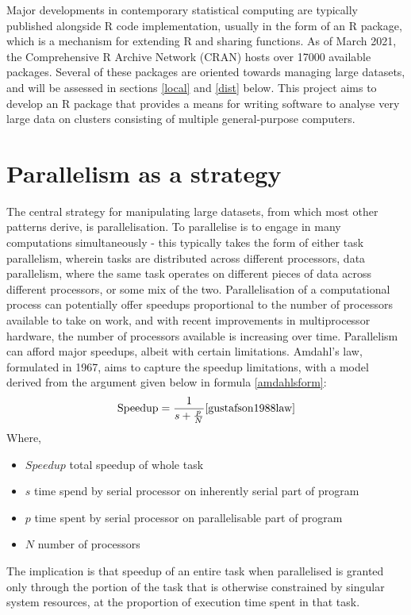 \documentclass[a4paper,10pt]{article}
\begin{document}
Major developments in contemporary statistical computing are typically published alongside R code implementation, usually in the form of an R package, which is a mechanism for extending R and sharing functions.
As of March 2021, the Comprehensive R Archive Network (CRAN) hosts over 17000 available packages\cite{team20:_r}.
Several of these packages are oriented towards managing large datasets, and will be assessed in sections \ref{local} and \ref{dist}  below.
This project aims to develop an R package that provides a means for writing software to analyse very large data on clusters consisting of multiple general-purpose computers.

\section{Parallelism as a strategy}
\label{parallel}
The central strategy for manipulating large datasets, from which most other patterns derive, is parallelisation. To parallelise is to engage in many computations simultaneously - this typically takes the form of either task parallelism, wherein tasks are distributed across different processors, data parallelism, where the same task operates on different pieces of data across different processors, or some mix of the two.
Parallelisation of a computational process can potentially offer speedups proportional to the number of processors available to take on work, and with recent improvements in multiprocessor hardware, the number of processors available is increasing over time.
Parallelism can afford major speedups, albeit with certain limitations.
Amdahl's law, formulated in 1967, aims to capture the speedup limitations, with a model derived from the argument given below in formula \ref{amdahlsform}\cite{amdahl1967law}:
\begin{equation}
	\label{amdahlsform}
	\textrm{Speedup} = \frac{1}{s+\frac{p}{N}} \cite{gustafson1988law}
\end{equation}
Where,
\begin{itemize}
	\item \(Speedup\) total speedup of whole task
	\item \(s\) time spend by serial processor on inherently serial part of program
	\item \(p\) time spent by serial processor on parallelisable part of program
	\item \(N\) number of processors
\end{itemize}
The implication is that speedup of an entire task when parallelised is granted only through the portion of the task that is otherwise constrained by singular system resources, at the proportion of execution time spent in that task.
\end{document}

